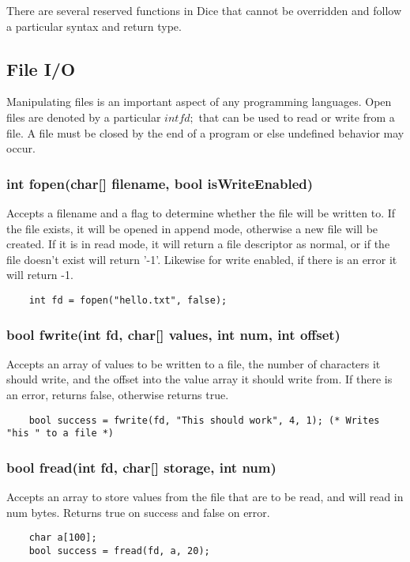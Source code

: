 \begin{homeworkProblem}
	There are several reserved functions in Dice that cannot be overridden and follow a particular syntax and return type.
	
	\subsection{File I/O}
	
	Manipulating files is an important aspect of any programming languages. Open files are denoted by a particular $int fd;$ that can be used to read or write from a file. A file must be closed by the end of a program or else undefined behavior may occur. 
	\subsubsection{int fopen(char[] filename, bool isWriteEnabled)}
	Accepts a filename and a flag to determine whether the file will be written to. If the file exists, it will be opened in append mode, otherwise a new file will be created. If it is in read mode, it will return a file descriptor as normal, or if the file doesn't exist will return '-1'. Likewise for write enabled, if there is an error it will return -1. 
	\begin{verbatim} 
	int fd = fopen("hello.txt", false);
	\end{verbatim}
		
	\subsubsection{bool fwrite(int fd, char[] values, int num, int offset)}
	Accepts an array of values to be written to a file, the number of characters it should write, and the offset into the value array it should write from. If there is an error, returns false, otherwise returns true. 
	\begin{verbatim} 
	bool success = fwrite(fd, "This should work", 4, 1); (* Writes "his " to a file *)
	\end{verbatim}
	
	\subsubsection{bool fread(int fd, char[] storage, int num)}
	Accepts an array to store values from the file that are to be read, and will read in num bytes. Returns true on success and false on error.
	\begin{verbatim} 
	char a[100];
	bool success = fread(fd, a, 20);
	\end{verbatim}
	

\end{homeworkProblem}
